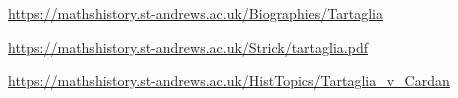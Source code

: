 \url{https://mathshistory.st-andrews.ac.uk/Biographies/Tartaglia}

\url{https://mathshistory.st-andrews.ac.uk/Strick/tartaglia.pdf}

\url{https://mathshistory.st-andrews.ac.uk/HistTopics/Tartaglia_v_Cardan} %
